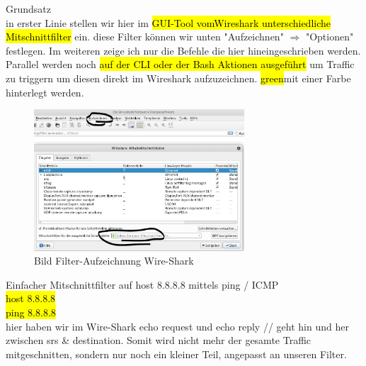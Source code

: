 \documentclass[]{article}
\begin{document}
\begin{description}
	\item Grundsatz\\
	in erster Linie stellen wir hier im {\hl{GUI-Tool vomWireshark unterschiedliche Mitschnittfilter}} ein. diese Filter können wir unten "Aufzeichnen" $\Rightarrow$ "Optionen" festlegen. Im weiteren zeige ich nur die Befehle die hier hineingeschrieben werden. Parallel werden noch {\hl{auf der CLI oder der Bash Aktionen ausgeführt}} um Traffic zu triggern um diesen direkt im Wireshark aufzuzeichnen. \hl{green}{mit einer Farbe hinterlegt} werden.
	\begin{figure}[htbp] 
		\centering
		\includegraphics[width=0.7\textwidth]{./imgs/Picture1.jpg}
		\caption{Bild Filter-Aufzeichnung Wire-Shark}
		\label{fig:Bild1}
		
	\end{figure}
		
	\item Einfacher Mitschnittfilter auf host 8.8.8.8 mittels ping / ICMP\\
	{\hl{host 8.8.8.8}} \\
	{\hl{ping 8.8.8.8}} \\ 
	hier haben wir im Wire-Shark echo request und echo reply // geht hin und her zwischen srs \& destination. Somit wird nicht mehr der gesamte Traffic mitgeschnitten, sondern nur noch ein kleiner Teil, angepasst an unseren Filter.
	

\end{description}
\end{document}
